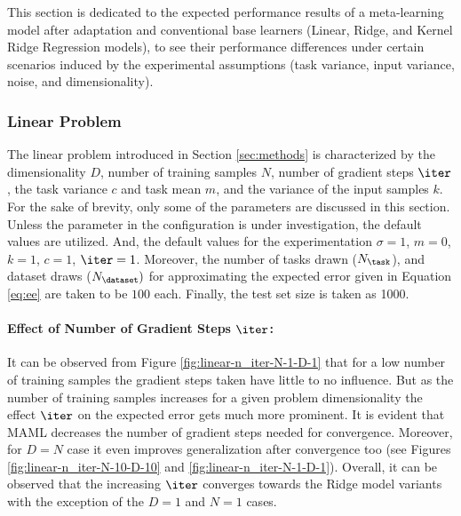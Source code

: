 This section is dedicated to the expected performance results of a meta-learning model after adaptation and conventional base learners (\eg Linear, Ridge, and Kernel Ridge Regression models), to see their performance differences under certain scenarios induced by the experimental assumptions (\eg task variance, input variance, noise, and dimensionality). 

\subsubsection{Linear Problem}
The linear problem introduced in Section \ref{sec:methods} is characterized by the dimensionality $D$, number of training samples $N$, number of gradient steps $\iter$, the task variance $c$ and task mean $m$, and the variance of the input samples $k$. For the sake of brevity, only some of the parameters are discussed in this section. Unless the parameter in the configuration is under investigation, the default values are utilized. And, the default values for the experimentation $\sigma=1$, $m=0$, $k=1$, $c=1$, $\iter=1$.
Moreover, the number of tasks drawn ($N_{\task}$), and dataset draws ($N_{\dataset})$  for approximating the expected error given in Equation \ref{eq:ee} are taken to be $100$ each. Finally, the test set size is taken as 1000.


\paragraph{Effect of Number of Gradient Steps $\iter$:} It can be observed from Figure \ref{fig:linear-n_iter-N-1-D-1} that for a low number of training samples the gradient steps taken have little to no influence. But as the number of training samples increases for a given problem dimensionality the effect $\iter$ on the expected error gets much more prominent. It is evident that MAML decreases the number of gradient steps needed for convergence. Moreover, for $D=N$ case it even improves generalization after convergence too (see Figures \ref{fig:linear-n_iter-N-10-D-10} and \ref{fig:linear-n_iter-N-1-D-1}). Overall, it can be observed that the increasing $\iter$ converges towards the Ridge model variants with the exception of the $D=1$ and $N=1$ cases.
 
